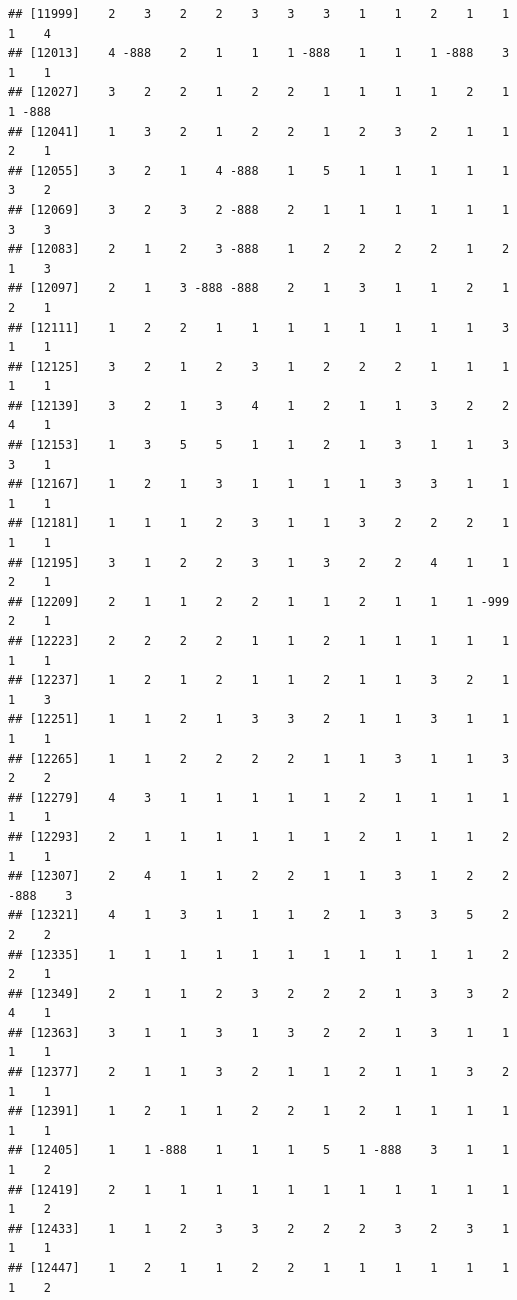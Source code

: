 \documentclass[
  12pt,
  openany]{book}
\begin{document}
\begin{verbatim}
## [11999]    2    3    2    2    3    3    3    1    1    2    1    1    1    4
## [12013]    4 -888    2    1    1    1 -888    1    1    1 -888    3    1    1
## [12027]    3    2    2    1    2    2    1    1    1    1    2    1    1 -888
## [12041]    1    3    2    1    2    2    1    2    3    2    1    1    2    1
## [12055]    3    2    1    4 -888    1    5    1    1    1    1    1    3    2
## [12069]    3    2    3    2 -888    2    1    1    1    1    1    1    3    3
## [12083]    2    1    2    3 -888    1    2    2    2    2    1    2    1    3
## [12097]    2    1    3 -888 -888    2    1    3    1    1    2    1    2    1
## [12111]    1    2    2    1    1    1    1    1    1    1    1    3    1    1
## [12125]    3    2    1    2    3    1    2    2    2    1    1    1    1    1
## [12139]    3    2    1    3    4    1    2    1    1    3    2    2    4    1
## [12153]    1    3    5    5    1    1    2    1    3    1    1    3    3    1
## [12167]    1    2    1    3    1    1    1    1    3    3    1    1    1    1
## [12181]    1    1    1    2    3    1    1    3    2    2    2    1    1    1
## [12195]    3    1    2    2    3    1    3    2    2    4    1    1    2    1
## [12209]    2    1    1    2    2    1    1    2    1    1    1 -999    2    1
## [12223]    2    2    2    2    1    1    2    1    1    1    1    1    1    1
## [12237]    1    2    1    2    1    1    2    1    1    3    2    1    1    3
## [12251]    1    1    2    1    3    3    2    1    1    3    1    1    1    1
## [12265]    1    1    2    2    2    2    1    1    3    1    1    3    2    2
## [12279]    4    3    1    1    1    1    1    2    1    1    1    1    1    1
## [12293]    2    1    1    1    1    1    1    2    1    1    1    2    1    1
## [12307]    2    4    1    1    2    2    1    1    3    1    2    2 -888    3
## [12321]    4    1    3    1    1    1    2    1    3    3    5    2    2    2
## [12335]    1    1    1    1    1    1    1    1    1    1    1    2    2    1
## [12349]    2    1    1    2    3    2    2    2    1    3    3    2    4    1
## [12363]    3    1    1    3    1    3    2    2    1    3    1    1    1    1
## [12377]    2    1    1    3    2    1    1    2    1    1    3    2    1    1
## [12391]    1    2    1    1    2    2    1    2    1    1    1    1    1    1
## [12405]    1    1 -888    1    1    1    5    1 -888    3    1    1    1    2
## [12419]    2    1    1    1    1    1    1    1    1    1    1    1    1    2
## [12433]    1    1    2    3    3    2    2    2    3    2    3    1    1    1
## [12447]    1    2    1    1    2    2    1    1    1    1    1    1    1    2

\end{verbatim}
\end{document}
